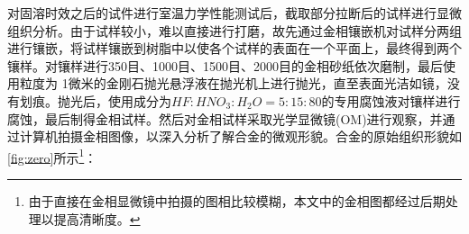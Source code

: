 对固溶时效之后的试件进行室温力学性能测试后，截取部分拉断后的试样进行显微组织分析。由于试样较小，难以直接进行打磨，故先通过金相镶嵌机对试样分两组进行镶嵌，将试样镶嵌到树脂中以使各个试样的表面在一个平面上，最终得到两个镶样。对镶样进行350目、1000目、1500目、2000目的金相砂纸依次磨制，最后使用粒度为 1微米的金刚石抛光悬浮液在抛光机上进行抛光，直至表面光洁如镜，没有划痕。抛光后，使用成分为$ HF:HNO_3:H_2O=5:15:80 $的专用腐蚀液对镶样进行腐蚀，最后制得金相试样。然后对金相试样采取光学显微镜(OM)进行观察，并通过计算机拍摄金相图像，以深入分析了解合金的微观形貌。合金的原始组织形貌如\ref{fig:zero}所示\footnote{由于直接在金相显微镜中拍摄的图相比较模糊，本文中的金相图都经过后期处理以提高清晰度。}：
\begin{figure}[htbp]
	\centering
\end{figure}
